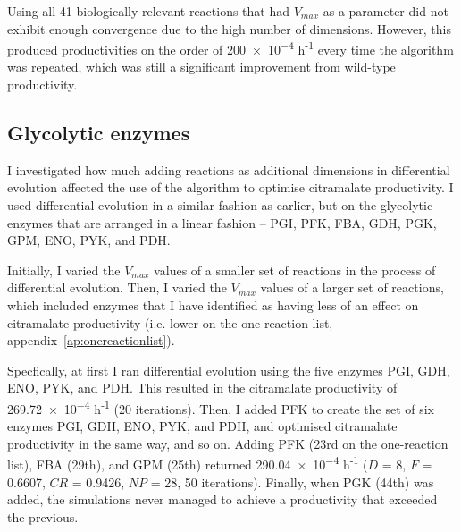 \documentclass[parskip=full, numbers=noenddot]{scrreprt}
\begin{document}
Using all 41 biologically relevant reactions that had $V_{max}$ as a parameter did not exhibit enough convergence due to the high number of dimensions. However, this produced productivities on the order of \num{200e-4} h\textsuperscript{-1} every time the algorithm was repeated, which was still a significant improvement from wild-type productivity.
\subsection{Glycolytic enzymes}
\label{ssec:glycolytic}


I investigated how much adding reactions as additional dimensions in differential evolution affected the use of the algorithm to optimise citramalate productivity. I used differential evolution in a similar fashion as earlier, but on the glycolytic enzymes that are arranged in a linear fashion --  PGI, PFK, FBA, GDH, PGK, GPM, ENO, PYK, and PDH.

Initially, I varied the $V_{max}$ values of a smaller set of reactions in the process of differential evolution. Then, I varied the $V_{max}$ values of a larger set of reactions, which included enzymes that I have identified as having less of an effect on citramalate productivity (i.e. lower on the one-reaction list, appendix~\ref{ap:onereactionlist}).

Specfically, at first I ran differential evolution using the five enzymes PGI, GDH, ENO, PYK, and PDH. This resulted in the citramalate productivity of \num{269.72e-4} h\textsuperscript{-1} (20 iterations). Then, I added PFK to create the set of six enzymes PGI, GDH, ENO, PYK, and PDH, and optimised citramalate productivity in the same way, and so on. Adding PFK (23rd on the one-reaction list), FBA (29th), and GPM (25th) returned \num{290.04e-4} h\textsuperscript{-1} ($D$ = 8, $F$ = 0.6607, $CR$ = 0.9426, $NP$ = 28, 50 iterations). Finally, when PGK (44th) was added, the simulations never managed to achieve a productivity that exceeded the previous.
\end{document}
